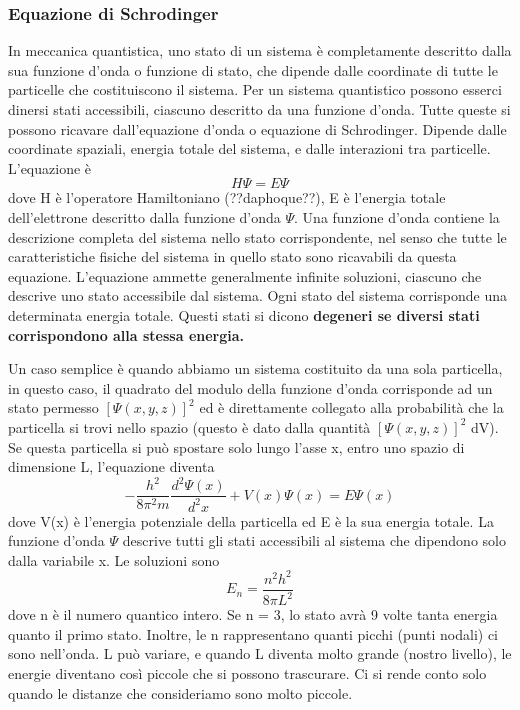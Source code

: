 \documentclass[a4paper]{article}
\begin{document}
\subsubsection{Equazione di Schrodinger}
In meccanica quantistica, uno stato di un sistema è completamente descritto dalla sua funzione d'onda o funzione di stato, che dipende dalle coordinate di tutte le particelle che costituiscono il sistema. Per un sistema quantistico possono esserci dinersi stati accessibili, ciascuno descritto da una funzione d'onda. Tutte queste si possono ricavare dall'equazione d'onda o equazione di Schrodinger. Dipende dalle coordinate spaziali, energia totale del sistema, e dalle interazioni tra particelle. L'equazione è 
\begin{equation*}
    H\Psi = E \Psi
\end{equation*}
dove H è l'operatore Hamiltoniano (??daphoque??), E è l'energia totale dell'elettrone descritto dalla funzione d'onda $\Psi$. Una funzione d'onda contiene la descrizione completa del sistema nello stato corrispondente, nel senso che tutte le caratteristiche fisiche del sistema in quello stato sono ricavabili da questa equazione. L'equazione ammette generalmente infinite soluzioni, ciascuno che descrive uno stato accessibile dal sistema. Ogni stato del sistema corrisponde una determinata energia totale. Questi stati si dicono \bfseries degeneri \mdseries se diversi stati corrispondono alla stessa energia. 

Un caso semplice è quando abbiamo un sistema costituito da una sola particella, in questo caso, il quadrato del modulo della funzione d'onda corrisponde ad un stato permesso $[\Psi(x,y,z)]^2$ ed è direttamente collegato alla probabilità che la particella si trovi nello spazio (questo è dato dalla quantità $[\Psi(x,y,z)]^2$ dV). Se questa particella si può spostare solo lungo l'asse x, entro uno spazio di dimensione L, l'equazione diventa 
\begin{equation*}
    -\frac{h^2}{8\pi^2m} \frac{d^2\Psi(x)}{d^2x}+V(x)\Psi(x) = E \Psi(x)
\end{equation*}
dove V(x) è l'energia potenziale della particella ed E è la sua energia totale. La funzione d'onda $\Psi$ descrive tutti gli stati accessibili al sistema che dipendono solo dalla variabile x. 
Le soluzioni sono 
\begin{equation*}
    E_n = \frac{n^2h^2}{8\pi L^2}
\end{equation*}
dove n è il numero quantico intero. Se n = 3, lo stato avrà 9 volte tanta energia quanto il primo stato. Inoltre, le n rappresentano quanti picchi (punti nodali) ci sono nell'onda. L può variare, e quando L diventa molto grande (nostro livello), le energie diventano così piccole che si possono trascurare. Ci si rende conto solo quando le distanze che consideriamo sono molto piccole. 
\end{document}
